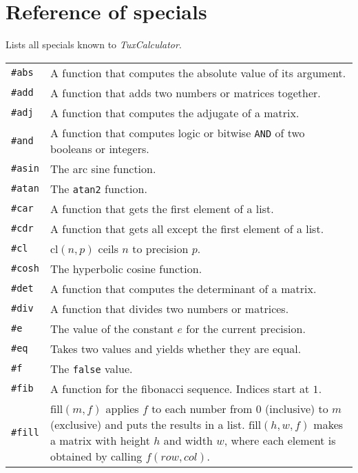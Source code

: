 \documentclass[10pt]{article}
\begin{document}
    \section{Reference of specials}\label{sec:reference-special}
    Lists all specials known to \textit{TuxCalculator}.
    \begin{longtable}{p{}p{}}
        \verb|#abs|    & A function that computes the absolute value of its argument. \\
        \verb|#add|    & A function that adds two numbers or matrices together. \\
        \verb|#adj|    & A function that computes the adjugate of a matrix. \\
        \verb|#and|    & A function that computes logic or bitwise \verb|AND| of two booleans or integers. \\
        \verb|#asin|   & The arc sine function. \\
        \verb|#atan|   & The \verb|atan2| function. \\
        \verb|#car|    & A function that gets the first element of a list. \\
        \verb|#cdr|    & A function that gets all except the first element of a list. \\
        \verb|#cl|     & $ \mathrm{cl}(n,p) $ ceils $ n $ to precision $ p $. \\
        \verb|#cosh|   & The hyperbolic cosine function. \\
        \verb|#det|    & A function that computes the determinant of a matrix. \\
        \verb|#div|    & A function that divides two numbers or matrices. \\
        \verb|#e|      & The value of the constant $ e $ for the current precision. \\
        \verb|#eq|     & Takes two values and yields whether they are equal. \\
        \verb|#f|      & The \verb|false| value. \\
        \verb|#fib|    & A function for the fibonacci sequence. Indices start at $ 1 $. \\
        \verb|#fill|   & $ \mathrm{fill}(m,f) $ applies $ f $ to each number from $ 0 $ (inclusive) to $ m $ (exclusive) and puts the results in a list.
                         $ \mathrm{fill}(h,w,f) $ makes a matrix with height $ h $ and width $ w $, where each element is obtained by calling $ f(row,col) $. \\

\end{longtable}
\end{document}
